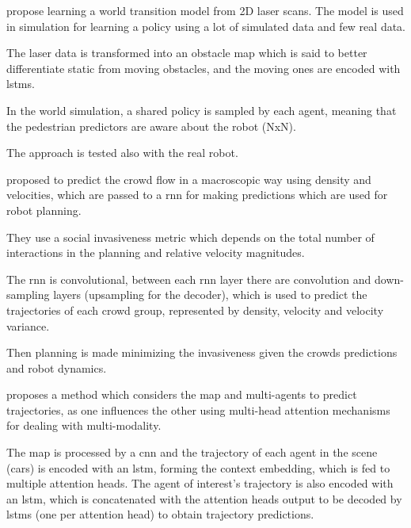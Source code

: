 
\cite{cui2021learning} propose learning a world transition model from 2D laser scans. The model is used in simulation for learning a policy using a lot of simulated data and few real data.

The laser data is transformed into an obstacle map which is said to better differentiate static from moving obstacles, and the moving ones are encoded with \glspl{lstm}.

In the world simulation, a shared policy is sampled by each agent, meaning that the pedestrian predictors are aware about the robot (NxN).

The approach is tested also with the real robot.
	


\cite{kiss2021probabilistic} proposed to predict the crowd flow in a macroscopic way using density and velocities, which are passed to a \gls{rnn} for making predictions which are used for robot planning.

They use a social invasiveness metric which depends on the total number of interactions in the planning and relative velocity magnitudes.

The \gls{rnn} is convolutional, between each \gls{rnn} layer there are convolution and down-sampling layers (upsampling for the decoder), which is used to predict the trajectories of each crowd group, represented by density, velocity and velocity variance.

Then planning is made minimizing the invasiveness given the crowds predictions and robot dynamics.  



\cite{messaoud2021trajectory} proposes a method which considers the map and multi-agents to predict trajectories, as one influences the other using multi-head attention mechanisms for dealing with multi-modality.

The map is processed by a \gls{cnn} and the trajectory of each agent in the scene (cars) is encoded with an \gls{lstm}, forming the context embedding, which is fed to multiple attention heads.
%
The agent of interest's trajectory is also encoded with an \gls{lstm}, which is concatenated with the attention heads output to be decoded by \glspl{lstm} (one per attention head) to obtain trajectory predictions.

